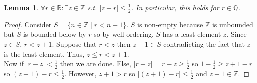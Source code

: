 \documentclass[12pt]{extarticle}
\newcommand{\Z}{\mathbb{Z}}
\newcommand{\Q}{\mathbb{Q}}
\newcommand{\R}{\mathbb{R}}
\newtheorem{lemma}[theorem]{Lemma}
\begin{document}
\begin{lemma} \label{approx} $\forall r \in \R : \exists z \in \Z$ s.t. $|z - r| \le \frac{1}{2}$. In particular, this holds for $r \in \Q$.
\end{lemma}
\begin{proof}
Consider $S = \{n \in \Z \mid r < n + 1 \}$. $S$ is non-empty because $\Z$ is unbounded but $S$ is bounded below by $r$ so by well ordering, $S$ has a least element $z$. Since $z \in S$, $r < z + 1$. Suppose that $r < z$ then $z - 1 \in S$ contradicting the fact that $z$ is the least element. Thus, $z \le r < z + 1$. \bigskip \\
Now if $|r - z| < \frac{1}{2}$ then we are done. Else, $|r - z| = r - z \ge \frac{1}{2}$ so $1 -  \frac{1}{2} \ge z + 1 - r$ so $(z + 1) - r \le \frac{1}{2}$. However, $z + 1 > r$ so $|(z + 1) - r| \le \frac{1}{2}$ and $z + 1 \in \Z$. 
\end{proof}
\end{document}

